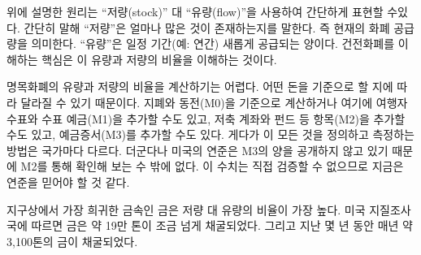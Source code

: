 \begin{comment}	
	The principle outlined above can be expressed more generally as the
	ratio of \enquote{stock} to \enquote{flow}. Simply put, the \textit{stock} is how much of
	something is currently there. For our purposes, the stock is a measure
	of the current money supply. The \textit{flow} is how much there is produced
	over a period of time (e.g. per year). The key to understanding sound
	money is in understanding this stock-to-flow ratio.
\end{comment}
위에 설명한 원리는 \enquote{저량(stock)} 대 \enquote{유량(flow)}을 사용하여 간단하게 표현할 수있다.
간단히 말해 \enquote{저량}은 얼마나 많은 것이 존재하는지를 말한다. 즉 현재의 화폐 공급량을 의미한다. 
\enquote{유량}은 일정 기간(예: 연간) 새롭게 공급되는 양이다.
건전화폐를 이해하는 핵심은 이 유량과 저량의 비율을 이해하는 것이다.

\begin{comment}	
	Calculating the stock-to-flow ratio for fiat currency is difficult, because how
	much money there is depends on how you look at it.~\cite{wiki:money-supply} You
	could count only banknotes and coins (M0), add traveler checks and check
	deposits (M1), add saving accounts and mutual funds and some other things (M2),
	and even add certificates of deposit to all of that (M3). Further, how all of
	this is defined and measured varies from country to country and since the US
	Federal Reserve stopped publishing \cite{web:fed-m3} numbers for M3, we will
	have to make do with the M2 monetary supply. I would love to verify these
	numbers, but I guess we have to trust the fed for now.
\end{comment}
명목화폐의 유량과 저량의 비율을 계산하기는 어렵다. 
어떤 돈을 기준으로 할 지에 따라 달라질 수 있기 때문이다\cite{wiki:money-supply}.
지폐와 동전(M0)을 기준으로 계산하거나 여기에 여행자 수표와 수표 예금(M1)을 추가할 수도 있고, 
저축 계좌와 펀드 등 항목(M2)을 추가할 수도 있고, 예금증서(M3)를 추가할 수도 있다.
게다가 이 모든 것을 정의하고 측정하는 방법은 국가마다 다르다.
더군다나 미국의 연준은 M3의 양을 공개하지 않고 있기 때문에 M2를 통해 확인해 보는 수 밖에 없다.\cite{web:fed-m3}
이 수치는 직접 검증할 수 없으므로 지금은 연준을 믿어야 할 것 같다.

\begin{comment}	
	Gold, one of the rarest metals on earth, has the highest stock-to-flow
	ratio. According to the US Geological Survey, a little more than 190,000
	tons have been mined. In the last few years, around 3100 tons of gold
	have been mined per year.~\cite{mineral-commodity-summaries}
\end{comment}
지구상에서 가장 희귀한 금속인 금은 저량 대 유량의 비율이 가장 높다.
미국 지질조사국에 따르면 금은 약 19만 톤이 조금 넘게 채굴되었다.
그리고 지난 몇 년 동안 매년 약 3,100톤의 금이 채굴되었다.~\cite{mineral-commodity-summaries}

